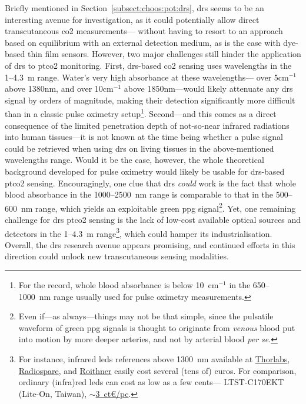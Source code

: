 Briefly mentioned in Section~\ref{subsect:choos:pot:drs}, \gls{drs} seems to be an interesting avenue for investigation, as it could potentially allow direct transcutaneous \gls{co2} measurements---\ie{} without having to resort to an approach based on equilibrium with an external detection medium, as is the case with dye-based thin film sensors. However, two major challenges still hinder the application of \gls{drs} to \gls{ptco2} monitoring. First, \gls{drs}-based \gls{co2} sensing uses wavelengths in the 1--4.3~\textmu{}m range\cite{domjan1994, schaden2004}. Water's very high absorbance at these wavelengths---\ie{} over 5cm$^{-1}$ above 1380nm, and over 10cm$^{-1}$ above 1850nm\cite{kou1993}---would likely attenuate any \gls{drs} signal by orders of magnitude, making their detection significantly more difficult than in a classic pulse oximetry setup\footnote{For the record, whole blood absorbance is below 10~cm$^{-1}$ in the 650--1000~nm range usually used for pulse oximetry measurements\cite{bosschaart2014}.}. Second---and this comes as a direct consequence of the limited penetration depth of not-so-near infrared radiations into human tissues---it is not known at the time being whether a pulse signal could be retrieved when using \gls{drs} on living tissues in the above-mentioned wavelengths range. Would it be the case, however, the whole theoretical background developed for pulse oximetry would likely be usable for \gls{drs}-based \gls{ptco2} sensing. Encouragingly, one clue that \gls{drs} \emph{could} work is the fact that whole blood absorbance in the 1000--2500~nm range is comparable to that in the 500--600~nm range\cite{bosschaart2014}, which yields an exploitable green \gls{ppg} signal\footnote{Even if---as always---things may not be that simple, since the pulsatile waveform of green \gls{ppg} signals is thought to originate from \emph{venous} blood put into motion by more deeper arteries, and not by arterial blood \textit{per se}\cite{kamshilin2017}.}. Yet, one remaining challenge for \gls{drs} \gls{ptco2} sensing is the lack of low-cost available optical sources and detectors in the 1--4.3~\textmu{}m range\footnote{For instance, infrared \glspl{led} references above 1300~nm available at \href{https://web.archive.org/web/20240929023831/https://www.thorlabs.com/newgrouppage9.cfm?objectgroup_id=2814}{Thorlabs}, \href{http://web.archive.org/web/20241008134940/https://fr.rs-online.com/web/c/afficheurs-et-optoelectronique/led-diodes-electroluminescentes/leds-infrarouges/?applied-dimensions=4291007801\%2C4291007802\%2C4291453920&pn=1&sortBy=P_breakPrice1&sortType=ASC&group_by_tn=false}{Radiospare}, and \href{http://web.archive.org/web/20241008130626/https://www.roithner-laser.com/pricelist.pdf}{Roithner} easily cost several (tens of) euros. For comparison, ordinary (infra)red \glspl{led} can cost as low as a few cents---\eg{} LTST-C170EKT (Lite-On, Taiwan), \href{http://web.archive.org/web/20241009074635/https://fr.rs-online.com/web/p/leds/1689711}{$\sim$3~ct\euro/pc}.}, which could hamper its industrialisation. Overall, the \gls{drs} research avenue appears promising, and continued efforts in this direction could unlock new transcutaneous sensing modalities.

